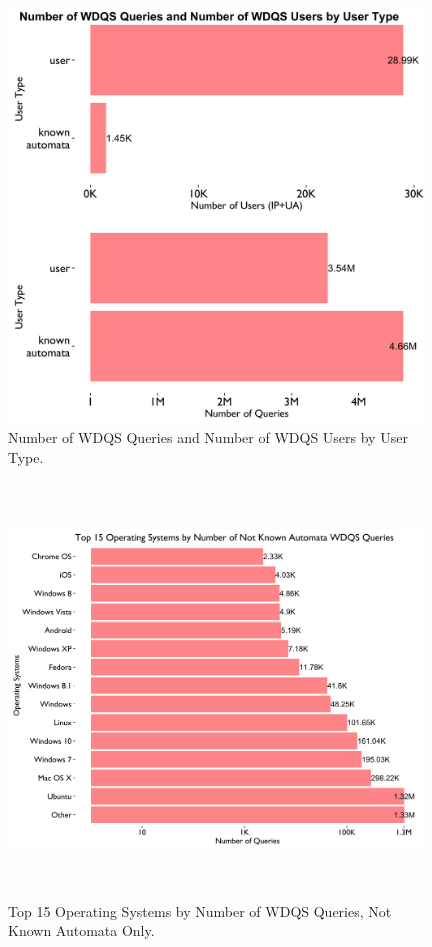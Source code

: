 \documentclass[12pt,]{article}
\begin{document}
\begin{figure}[H]
\centering
\includegraphics[width=11cm,height=11cm,keepaspectratio]{figures/by_agent_type.png}
\caption{Number of WDQS Queries and Number of WDQS Users by User Type.}
\end{figure}

\begin{figure}[H]
\centering
\includegraphics[width=11cm,height=11cm,keepaspectratio]{figures/n_query_by_os.png}
\caption{Top 15 Operating Systems by Number of WDQS Queries, Not Known
Automata Only.}
\end{figure}
\end{document}
